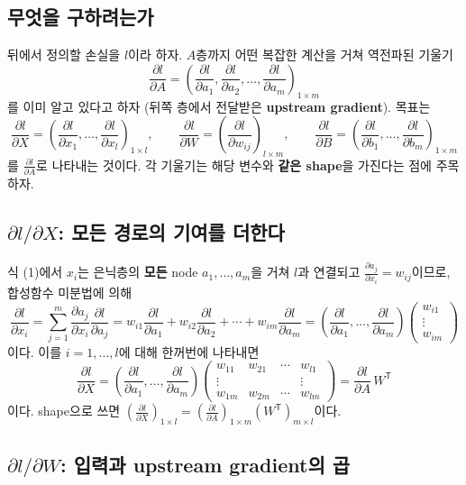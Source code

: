\documentclass[11pt,a4paper]{article}
\newcommand{\T}{^{\mathsf T}}
\newcommand{\pd}[2]{\frac{\partial #1}{\partial #2}}
\begin{document}
\subsection{무엇을 구하려는가}

뒤에서 정의할 손실을 $l$이라 하자.
$A$층까지 어떤 복잡한 계산을 거쳐 역전파된 기울기
\[
\pd{l}{A}=\left(\pd{l}{a_1},\pd{l}{a_2},\ldots,\pd{l}{a_m}\right)_{1\times m}
\]
를 이미 알고 있다고 하자 (뒤쪽 층에서 전달받은 \textbf{upstream gradient}).
목표는
\[
\pd{l}{X}=\left(\pd{l}{x_1},\ldots,\pd{l}{x_l}\right)_{1\times l},
\qquad
\pd{l}{W}=\left(\pd{l}{w_{ij}}\right)_{l\times m},
\qquad
\pd{l}{B}=\left(\pd{l}{b_1},\ldots,\pd{l}{b_m}\right)_{1\times m}
\]
를 $\pd{l}{A}$로 나타내는 것이다.
각 기울기는 해당 변수와 \textbf{같은 shape}을 가진다는 점에 주목하자.

\subsection{$\partial l/\partial X$: 모든 경로의 기여를 더한다}

식 (1)에서 $x_i$는 은닉층의 \textbf{모든} node $a_1,\ldots,a_m$을 거쳐 $l$과 연결되고
$\pd{a_j}{x_i}=w_{ij}$이므로, 합성함수 미분법에 의해
\[
\pd{l}{x_i}
=\sum_{j=1}^{m}\pd{a_j}{x_i}\pd{l}{a_j}
=w_{i1}\pd{l}{a_1}+w_{i2}\pd{l}{a_2}+\cdots+w_{im}\pd{l}{a_m}
=\left(\pd{l}{a_1},\ldots,\pd{l}{a_m}\right)
\begin{pmatrix}w_{i1}\\ \vdots\\ w_{im}\end{pmatrix}
\]
이다. 이를 $i=1,\ldots,l$에 대해 한꺼번에 나타내면
\[
\pd{l}{X}
=\left(\pd{l}{a_1},\ldots,\pd{l}{a_m}\right)
\begin{pmatrix}
w_{11}&w_{21}&\cdots&w_{l1}\\
\vdots&&&\vdots\\
w_{1m}&w_{2m}&\cdots&w_{lm}
\end{pmatrix}
=\pd{l}{A}\,W\T
\]
이다. shape으로 쓰면
$\left(\pd{l}{X}\right)_{1\times l}=\left(\pd{l}{A}\right)_{1\times m}\left(W\T\right)_{m\times l}$이다.

\subsection{$\partial l/\partial W$: 입력과 upstream gradient의 곱}
\end{document}
